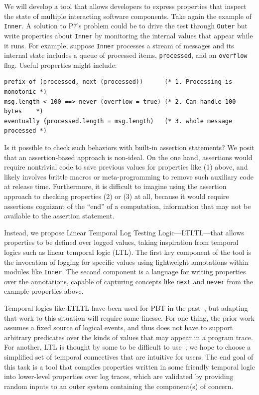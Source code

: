 We will develop a tool that allows developers to express properties that inspect
the state of multiple interacting software components. Take again the example of
\lstinline{Inner}. A solution to P7's problem could be to drive the
test through \lstinline{Outer} but write properties about
\lstinline{Inner} by monitoring the internal values that appear while it
runs. For example, suppose
\lstinline{Inner} processes a stream of messages and its internal state
includes a queue of processed items, \lstinline{processed}, and an
\lstinline{overflow} flag. Useful properties might include:

\begin{lstlisting}
prefix_of (processed, next (processed))      (* 1. Processing is monotonic *)
msg.length < 100 ==> never (overflow = true) (* 2. Can handle 100 bytes    *)
eventually (processed.length = msg.length)   (* 3. whole message processed *)
\end{lstlisting}

Is it possible to check such behaviors with built-in assertion statements? We
posit that an assertion-based approach is non-ideal. On the one hand, assertions
would require nontrivial code to save previous values for properties like (1)
above, and likely involves brittle macros or meta-programming to remove such
auxiliary code at release time. Furthermore, it is difficult to imagine using
the assertion approach to checking properties (2) or (3) at all, because it
would require assertions cognizant of the ``end'' of a computation, information
that may not be available to the assertion statement.

Instead, we propose Linear Temporal Log Testing Logic---LTLTL---that allows
properties to be defined over logged values, taking inspiration from temporal
logics such as linear temporal logic (LTL).  The first key component of the tool
is the invocation of logging for specific values using lightweight annotations
within modules like \lstinline{Inner}. The second component is a language for
writing properties over the annotations, capable of capturing concepts like
\lstinline{next} and \lstinline{never} from the example properties above.

Temporal logics like LTLTL have been used for PBT in the
past~\cite{oconnor_quickstrom_2022}, but adapting that work to this
situation will require some finesse. For one thing, the prior work
assumes a fixed source of logical events, and thus does not have to
support arbitrary predicates over the kinds of values that may appear
in a program trace. For another, LTL is thought by some to be
difficult to use~\cite{greenman_little_2022}; we hope to choose a
simplified set of temporal connectives that are intuitive for users.
%
The end goal of this task is a tool that compiles properties written
in some friendly temporal logic into lower-level properties over log
traces, which are validated by providing random inputs to an outer
system {containing} the component(s) of concern.

